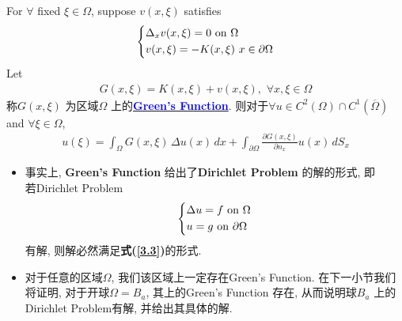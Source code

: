 	\begin{defn}\label{def 3.5.1}
		For $\forall$ fixed $\xi \in \Omega$, suppose $v(x , \xi)$ satisfies
		\begin{align*}
			\begin{dcases*}
				\Delta_x v(x , \xi) = 0 \,\, \text{on} \,\, \Omega \\
				v(x , \xi) = - K(x , \xi) \,\, x \in \partial \Omega
			\end{dcases*}
		\end{align*}
		Let 
		\begin{align*}
			G(x , \xi) = K(x , \xi) + v(x , \xi) , \,\, \forall x , \xi \in \Omega
		\end{align*}
		称$G(x , \xi)$ 为区域$\Omega$ 上的\underline{\textcolor{blue}{\textbf{Green's Function}}}. 则对于$\forall u \in C^2(\Omega) \cap C^1 \left( \overline{\Omega} \right)$ and $\forall \xi \in \Omega$, 
		\begin{align}
			u(\xi) 
			= \int_{\Omega} G(x , \xi) \, \Delta u(x) \, dx 
			+ \int_{\partial \Omega} \frac{\partial G(x , \xi)}{\partial n_x} u(x) \, dS_x \label{3.3}
		\end{align}
		
		\vspace*{4em}
		
		\begin{rmk}
			\begin{itemize}
				\item 事实上, \textbf{Green's Function} 给出了\textbf{Dirichlet Problem} 的解的形式, 即 \\
				若Dirichlet Problem
				\begin{align*}
					\begin{dcases*}
						\Delta u = f \,\, \text{on} \,\, \Omega \\
						u = g \,\, \text{on} \,\, \partial \Omega
					\end{dcases*}
				\end{align*}
				有解, 则解必然满足\textbf{式(\ref{3.3})}的形式. 
				
				\vspace*{4em}
				
				\item 对于任意的区域$\Omega$, 我们\textbf{}该区域上一定存在Green's Function. 在下一小节我们将证明, 对于开球$\Omega = B_a$, 其上的Green's Function 存在, 从而说明球$B_a$ 上的Dirichlet Problem有解, 并给出其具体的解. 
			\end{itemize}
		\end{rmk}
	\end{defn}

